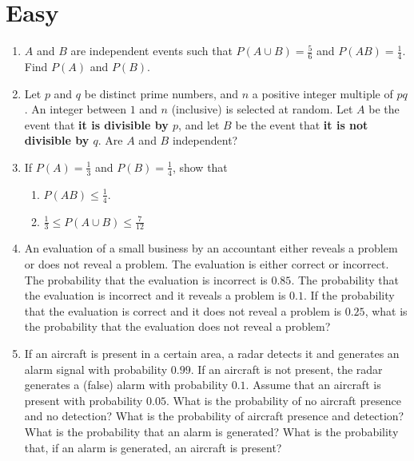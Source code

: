 \documentclass[svgnames]{amsart}
\begin{document}
\section{Easy}
\begin{enumerate}[leftmargin=*]
\item $A$ and $B$ are independent events such that $P(A \cup B) = \frac 5 6$ and $P(AB) = \frac 1 4$. Find $P(A)$ and $P(B)$.

\item Let $p$ and $q$ be distinct prime numbers, and $n$ a positive integer multiple of $pq$. An integer between $1$ and $n$ (inclusive) is selected at random. Let $A$ be the event that \textbf{it is divisible by $p$}, and let $B$ be the event that \textbf{it is not divisible by $q$}. Are $A$ and $B$ independent?

\item If $P(A) = \frac 1 3$ and $P(B) = \frac 1 4$, show that
\begin{enumerate}
	\item $P(AB) \le \frac 1 4$.
	\item $\frac 1 3 \le P(A \cup B) \le \frac 7 {12}$
\end{enumerate}

\item An evaluation of a small business by an accountant either reveals a problem or does not reveal a problem. The evaluation is either correct or incorrect. The probability that the evaluation is incorrect is $0.85$. The probability that the evaluation is incorrect and it reveals a problem is $0.1$. If the probability that the evaluation is correct and it does not reveal a problem is $0.25$, what is the probability that the evaluation does not reveal a problem?

\item If an aircraft is present in a certain area, a radar detects it and generates an alarm signal with probability $0.99$. If an aircraft is not present, the radar generates a (false) alarm with probability $0.1$. Assume that an aircraft is present with probability $0.05$. What is the probability of no aircraft presence and no detection? What is the probability of aircraft presence and detection? What is the probability that an alarm is generated? What is the probability that, if an alarm is generated, an aircraft is present?
\end{enumerate} %
\end{document}
